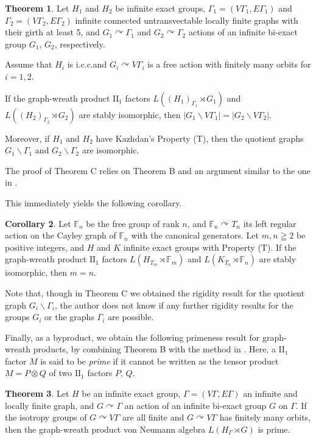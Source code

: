 \documentclass{amsart}
\theoremstyle{definition}
\newtheorem{mainthm}{Theorem}
\newtheorem{maincor}[mainthm]{Corollary}
\newcommand{\action}{\curvearrowright}
\newcommand{\twoone}{$\mathrm{II}_1$\xspace}
\begin{document}
\begin{mainthm}
Let $H_1$ and $H_2$ be infinite exact groups, 
$\Gamma_1=(V\Gamma_1, E\Gamma_1)$ and $\Gamma_2=(V\Gamma_2, E\Gamma_2)$ infinite connected untransvectable locally finite graphs with their girth at least 5, and $G_1\curvearrowright \Gamma_1$ and $G_2\action \Gamma_2$ actions of an infinite bi-exact group $G_1$, $G_2$, respectively. 

Assume that $H_i$ is i.c.c.\@ and $G_i\action V\Gamma_i$ is a free action with finitely many orbits for $i=1,2$. 

If the graph-wreath product $\mathrm{II}_1$ factors 
$L((H_1)_{\Gamma_1}\rtimes G_1)$ and $L((H_2)_{\Gamma_2}\rtimes G_2)$ are stably isomorphic, 
then $|G_1\backslash V\Gamma_1|=|G_2\backslash V\Gamma_2|$. 

Moreover, if $H_1$ and $H_2$ have Kazhdan's Property (T), then the quotient graphs $G_1\backslash \Gamma_1$ and $G_2\backslash \Gamma_2$ are isomorphic. 
\end{mainthm}

The proof of Theorem C relies on Theorem B and
an argument similar to the one in \cite[Section 6.1]{hi}. 

This immediately yields the following corollary. 

\begin{maincor}
Let $\mathbb{F}_n$ be the free group of rank $n$, and $\mathbb{F}_n\action T_n$ its left regular action on the Cayley graph of $\mathbb{F}_n$ with the canonical generators. Let $m, n\geqq 2$ be positive integers, and $H$ and $K$ infinite exact groups with Property (T). 
If the graph-wreath product $\mathrm{II}_1$ factors 
$L(H_{T_m}\rtimes \mathbb{F}_m)$ and $L(K_{T_n}\rtimes \mathbb{F}_n)$
are stably isomorphic, then $m=n$. 
\end{maincor}

Note that, though in Theorem C we obtained the rigidity result for
the quotient graph $G_i\backslash \Gamma_i$, the author does not know if any further rigidity results 
for the groups $G_i$ or the graphs $\Gamma_i$ are possible. 

Finally, as a byproduct, 
we obtain the following primeness result for
graph-wreath products, by combining Theorem B with the method in \cite[Section 7]{im}. 
Here, a \twoone factor $M$ is said to be
\emph{prime} if it cannot be written as the tensor product 
$M=P\overline{\otimes} Q$ of
two \twoone factors $P$, $Q$. 

\begin{mainthm}
Let $H$ be an infinite exact group, $\Gamma=(V\Gamma, E\Gamma)$ an infinite and locally finite graph, and $G\curvearrowright \Gamma$ an action of an infinite bi-exact group $G$ on $\Gamma$. If the isotropy groups of $G\curvearrowright V\Gamma$ are all finite and $G\action V\Gamma$ has finitely many orbits, then the graph-wreath product von Neumann algebra $L(H_{\Gamma}\rtimes G)$ is prime.
\end{mainthm}
\end{document}
